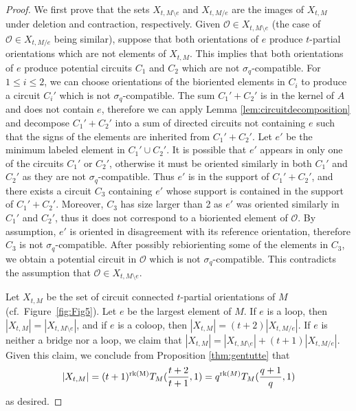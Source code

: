 \documentclass[12pt]{amsart}
\numberwithin{equation}{section}
\theoremstyle{definition}
\begin{document}
\begin{proof}
We first prove that the sets $X_{t,M\setminus e}$ and $X_{t,M/e}$ are the images of $X_{t,M}$ under deletion and contraction, respectively.  Given $\mathcal{O} \in X_{t,M\setminus e}$ (the case of $\mathcal{O} \in X_{t,M/ e}$ being similar), suppose that both orientations of $e$ produce $t$-partial orientations which are not elements of $X_{t,M}$.  This implies that both orientations of $e$ produce potential circuits $C_1$ and $C_2$ which are not $\sigma_q$-compatible.  For $1\leq i \leq 2$, we can choose orientations of the bioriented elements in $C_i$ to produce a circuit $C_i'$ which is not $\sigma_q$-compatible.  The sum $C_1'+C_2'$ is in the kernel of $A$ and does not contain $e$, therefore we can apply Lemma \ref{lem:circuitdecomposition} and decompose $C_1'+C_2'$ into a sum of directed circuits not containing $e$ such that the signs of the elements are inherited from $C_1'+C_2'$.  Let $e'$ be the minimum labeled element in $C_1' \cup C_2'$.  It is possible that $e'$ appears in only one of the circuits $C_1'$ or $C_2'$, otherwise it must be oriented similarly in both $C_1'$ and $C_2'$ as they are not $\sigma_q$-compatible. Thus $e'$ is in the support of $C_1'+C_2'$, and there exists a circuit $C_3$ containing $e'$ whose support is contained in the support of $C_1'+C_2'$.  Moreover, $C_3$ has size larger than 2 as $e'$ was oriented similarly in $C_1'$ and $C_2'$, thus it does not correspond to a bioriented element of $\mathcal{O}$.  By assumption, $e'$ is oriented in disagreement with its reference orientation, therefore $C_3$ is not $\sigma_q$-compatible.  After possibly rebiorienting some of the elements in $C_3$, we obtain a potential circuit in $\mathcal{O}$ which is not $\sigma_q$-compatible. This contradicts the assumption that $\mathcal{O} \in X_{t,M\setminus e}$. 

Let $X_{t,M}$ be the set of circuit connected $t$-partial orientations of $M$ (cf.~Figure~\ref{fig:Fig5}).
Let $e$ be the largest element of $M$.  
If $e$ is a loop, then $|X_{t,M}| = |X_{t,M\setminus e}|$, and if $e$ is a coloop, then $|X_{t,M}| = (t+2)|X_{t,M/e}|$.  
If $e$ is neither a bridge nor a loop, we claim that $|X_{t,M}| = |X_{t,M\setminus e}| + (t+1)|X_{t,M/e}|$.  
Given this claim, we conclude from Proposition \ref{thm:gentutte} that $$|X_{t,M}| =(t+1)^{\rm rk(M)}T_{M}(\frac{t+2}{t+1},1) =  q^{{\rm rk}(M)}T_{M}(\frac{q+1}{q},1)$$
as desired.


\end{proof}
\end{document}
